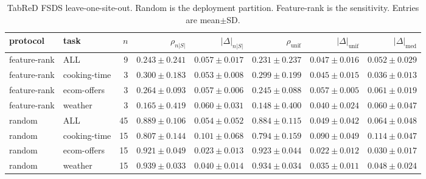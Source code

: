 \begin{table}[t]
\centering
\footnotesize
\renewcommand{\arraystretch}{1.15}
\setlength{\tabcolsep}{4pt}
\caption{TabReD FSDS leave-one-site-out.
Random is the deployment partition.
Feature-rank is the sensitivity.
Entries are mean\(\pm\)SD.}
\label{tab:tabred-fsds-loso}
\begin{tabular}{@{}ll r r r r r r@{}}
\toprule
protocol & task & \(n\)
 & \(\rho_{n|S|}\) & \(|\Delta|_{n|S|}\)
 & \(\rho_{\mathrm{unif}}\) & \(|\Delta|_{\mathrm{unif}}\)
 & \(|\Delta|_{\mathrm{med}}\) \\
\midrule
feature-rank & ALL          & 9  & \(0.243\pm 0.241\) & \(0.057\pm 0.017\) & \(0.231\pm 0.237\) & \(0.047\pm 0.016\) & \(0.052\pm 0.029\) \\
feature-rank & cooking-time & 3  & \(0.300\pm 0.183\) & \(0.053\pm 0.008\) & \(0.299\pm 0.199\) & \(0.045\pm 0.015\) & \(0.036\pm 0.013\) \\
feature-rank & ecom-offers  & 3  & \(0.264\pm 0.093\) & \(0.057\pm 0.006\) & \(0.245\pm 0.088\) & \(0.057\pm 0.005\) & \(0.061\pm 0.019\) \\
feature-rank & weather      & 3  & \(0.165\pm 0.419\) & \(0.060\pm 0.031\) & \(0.148\pm 0.400\) & \(0.040\pm 0.024\) & \(0.060\pm 0.047\) \\
\midrule
random & ALL          & 45 & \(0.889\pm 0.106\) & \(0.054\pm 0.052\) & \(0.884\pm 0.115\) & \(0.049\pm 0.042\) & \(0.064\pm 0.048\) \\
random & cooking-time & 15 & \(0.807\pm 0.144\) & \(0.101\pm 0.068\) & \(0.794\pm 0.159\) & \(0.090\pm 0.049\) & \(0.114\pm 0.047\) \\
random & ecom-offers  & 15 & \(0.921\pm 0.049\) & \(0.023\pm 0.013\) & \(0.923\pm 0.044\) & \(0.022\pm 0.012\) & \(0.030\pm 0.017\) \\
random & weather      & 15 & \(0.939\pm 0.033\) & \(0.040\pm 0.014\) & \(0.934\pm 0.034\) & \(0.035\pm 0.011\) & \(0.048\pm 0.024\) \\
\bottomrule
\end{tabular}
\end{table}

